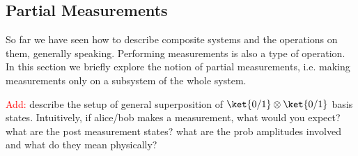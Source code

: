 \subsection{Partial Measurements}

So far we have seen how to describe composite systems and the operations on them, generally speaking. Performing measurements is also a type of operation. In this section we briefly explore the notion of partial measurements, i.e. making measurements only on a subsystem of the whole system.

\textcolor{red}{Add:} describe the setup of general superposition of $\ket{0/1}\otimes \ket{0/1}$ basis states. Intuitively, if alice/bob makes a measurement, what would you expect? what are the post measurement states? what are the prob amplitudes involved and what do they mean physically?

























% 
% 
% 

